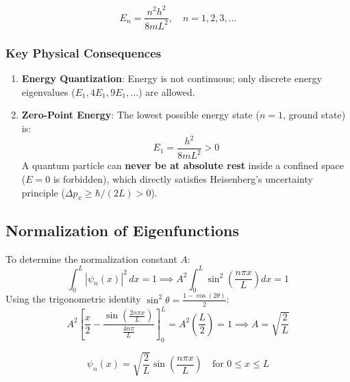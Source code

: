 \begin{keyequation}
\begin{equation}
    E_n = \frac{n^2 h^2}{8m L^2}, \quad n = 1, 2, 3, \dots
\end{equation}
\end{keyequation}

\subsubsection{Key Physical Consequences}
\begin{enumerate}
    \item \textbf{Energy Quantization}: Energy is not continuous; only discrete energy eigenvalues ($E_1, 4E_1, 9E_1, \dots$) are allowed.
    \item \textbf{Zero-Point Energy}: The lowest possible energy state ($n=1$, ground state) is:
    \begin{equation}
        E_1 = \frac{h^2}{8m L^2} > 0
    \end{equation}
    A quantum particle can \textbf{never be at absolute rest} inside a confined space ($E=0$ is forbidden), which directly satisfies Heisenberg's uncertainty principle ($\Delta p_x \ge \hbar/(2L) > 0$).
\end{enumerate}

\subsection{Normalization of Eigenfunctions}
To determine the normalization constant $A$:
\begin{equation}
    \int_0^L |\psi_n(x)|^2\,dx = 1 \implies A^2 \int_0^L \sin^2\left(\frac{n\pi x}{L}\right)dx = 1
\end{equation}
Using the trigonometric identity $\sin^2\theta = \frac{1 - \cos(2\theta)}{2}$:
\begin{equation}
    A^2 \left[ \frac{x}{2} - \frac{\sin\left(\frac{2n\pi x}{L}\right)}{\frac{4n\pi}{L}} \right]_0^L = A^2\left(\frac{L}{2}\right) = 1 \implies A = \sqrt{\frac{2}{L}}
\end{equation}

\begin{keyequation}
\begin{equation}
    \psi_n(x) = \sqrt{\frac{2}{L}}\sin\left(\frac{n\pi x}{L}\right) \quad \text{for } 0 \le x \le L
\end{equation}
\end{keyequation}

